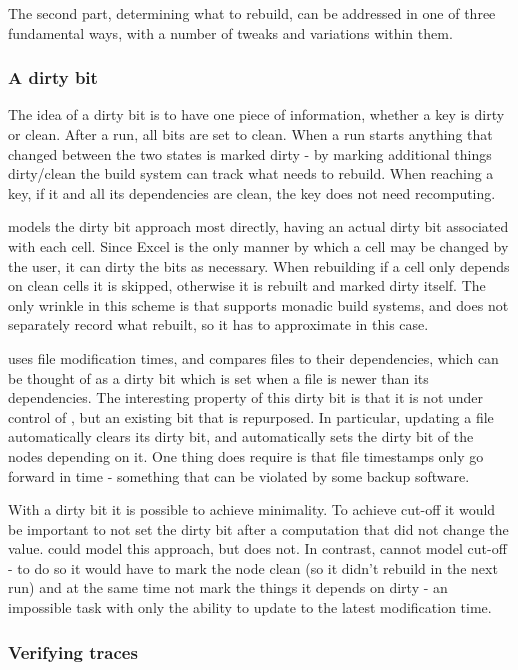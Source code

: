 The second part, determining what to rebuild, can be addressed in one of three fundamental ways, with a number of tweaks and variations within them.

\subsubsection{A dirty bit}

The idea of a dirty bit is to have one piece of information, whether a key is dirty or clean. After a run, all bits are set to clean. When a run starts anything that changed between the two states is marked dirty - by marking additional things dirty/clean the build system can track what needs to rebuild. When reaching a key, if it and all its dependencies are clean, the key does not need recomputing.

\Excel models the dirty bit approach most directly, having an actual dirty bit associated with each cell. Since Excel is the only manner by which a cell may be changed by the user, it can dirty the bits as necessary. When rebuilding if a cell only depends on clean cells it is skipped, otherwise it is rebuilt and marked dirty itself. The only wrinkle in this scheme is that \Excel supports monadic build systems, and does not separately record what rebuilt, so it has to approximate in this case.

\Make uses file modification times, and compares files to their dependencies, which can be thought of as a dirty bit which is set when a file is newer than its dependencies. The interesting property of this dirty bit is that it is not under control of \Make, but an existing bit that is repurposed. In particular, updating a file automatically clears its dirty bit, and automatically sets the dirty bit of the nodes depending on it. One thing \Make does require is that file timestamps only go forward in time - something that can be violated by some backup software.

With a dirty bit it is possible to achieve minimality. To achieve cut-off it would be important to not set the dirty bit after a computation that did not change the value. \Excel could model this approach, but does not. In contrast, \Make cannot model cut-off - to do so it would have to mark the node clean (so it didn't rebuild in the next run) and at the same time not mark the things it depends on dirty - an impossible task with only the ability to update to the latest modification time.

\subsubsection{Verifying traces}

